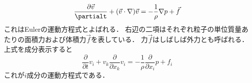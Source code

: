 \documentclass[a4paper]{jsarticle}
\begin{document}
\begin{equation}
\frac{\partial\vec{v}}{\partialt} + (\vec{v}\cdot\nabla)\vec{v} = - \frac{1}{\rho} \nabla p + \vec{f}
\end{equation}
これはEulerの運動方程式とよばれる．
右辺の二項はそれぞれ粒子の単位質量あたりの面積力および体積力$\vec{f}$を表している．
力$\vec{f}$はしばしば外力とも呼ばれる．
上式を成分表示すると
\begin{equation}
\frac{\partial}{\partial t} v_i +v_k \frac{\partial}{\partial x_k} v_i = - \frac{1}{\rho} \frac{\partial}{\partial x_i} p + f_i
\end{equation}
これが$i$成分の運動方程式である．
\end{document}
